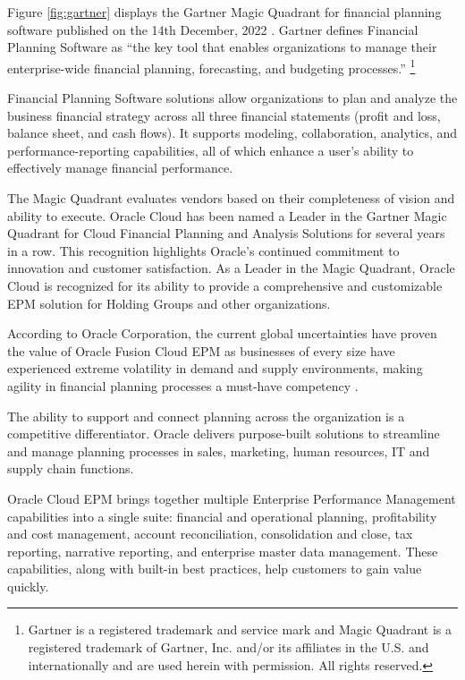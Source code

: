 \documentclass[12pt,a4paper,openright,twoside]{book}
\begin{document}
Figure \ref{fig:gartner} displays the Gartner Magic Quadrant for financial planning software published on the 14th December, 2022 \cite{gartner2022magic}.
%
Gartner defines Financial Planning Software as ``the key tool that enables organizations to manage their enterprise-wide financial planning, forecasting, and budgeting processes.'' \footnote{Gartner is a registered trademark and service mark and Magic Quadrant is a registered trademark of Gartner, Inc. and/or its affiliates in the U.S. and internationally and are used herein with permission. All rights reserved.}

Financial Planning Software solutions allow organizations to plan and analyze the business financial strategy across all three financial statements (profit and loss, balance sheet, and cash flows). 
%
It supports modeling, collaboration, analytics, and performance-reporting capabilities, all of which enhance a user’s ability to effectively manage financial performance.

The Magic Quadrant evaluates vendors based on their completeness of vision and ability to execute. 
%
Oracle Cloud has been named a Leader in the Gartner Magic Quadrant for Cloud Financial Planning and Analysis Solutions for several years in a row. 
%
This recognition highlights Oracle's continued commitment to innovation and customer satisfaction. 
%
As a Leader in the Magic Quadrant, Oracle Cloud is recognized for its ability to provide a comprehensive and customizable EPM solution for Holding Groups and other organizations.

According to Oracle Corporation, the current global uncertainties have proven the value of Oracle Fusion Cloud EPM as businesses of every size have experienced extreme volatility in demand and supply environments, making agility in financial planning processes a must-have competency \cite{toomey2022oracle}.

The ability to support and connect planning across the organization is a competitive differentiator. 
%
Oracle delivers purpose-built solutions to streamline and manage planning processes in sales, marketing, human resources, IT and supply chain functions.

Oracle Cloud EPM brings together multiple Enterprise Performance Management capabilities into a single suite: financial and operational planning, profitability and cost management, account reconciliation, consolidation and close, tax reporting, narrative reporting, and enterprise master data management. 
%
These capabilities, along with built-in best practices, help customers to gain value quickly.
\end{document}
